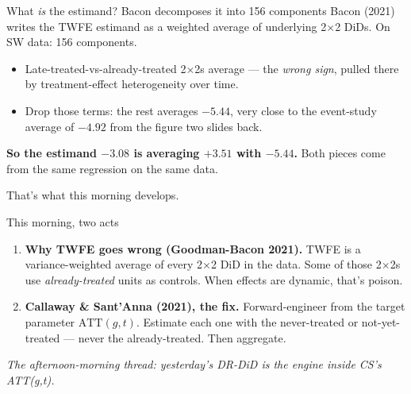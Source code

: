 \documentclass[aspectratio=169,11pt]{beamer}
\begin{document}
\begin{frame}{What \textit{is} the estimand?  Bacon decomposes it into 156 components}
\vspace{0.5em}
Bacon (2021) writes the TWFE estimand as a weighted average of underlying 2$\times$2 DiDs. \;On SW data: 156 components.

\vspace{0.7em}
\begin{itemize}
  \item Late-treated-vs-already-treated 2$\times$2s average  --- the \textit{wrong sign}, pulled there by treatment-effect heterogeneity over time.
  \vspace{0.3em}
  \item Drop those terms: the rest averages $-5.44$, very close to the event-study average of $-4.92$ from the figure two slides back.
\end{itemize}

\vspace{0.7em}
\textbf{So the estimand $-3.08$ is averaging $+3.51$ with $-5.44$.} \;Both pieces come from the same regression on the same data. \;

\vspace{0.4em}
That's what this morning develops.
\end{frame}

\begin{frame}{This morning, two acts}
\vspace{0.4em}
\begin{enumerate}
  \item \textbf{Why TWFE goes wrong (Goodman-Bacon 2021).} \;TWFE is a variance-weighted average of every 2$\times$2 DiD in the data. \;Some of those 2$\times$2s use \textit{already-treated} units as controls. \;When effects are dynamic, that's poison.
  \vspace{0.3em}
  \item \textbf{Callaway \& Sant'Anna (2021), the fix.} \;Forward-engineer from the target parameter $\text{ATT}(g,t)$. \;Estimate each one with the never-treated or not-yet-treated --- never the already-treated. \;Then aggregate.
\end{enumerate}

\vspace{0.6em}
\begin{center}
\small\color{warmgray}\itshape
The afternoon-morning thread: yesterday's DR-DiD is the engine inside CS's ATT(g,t).
\end{center}
\end{frame}
\end{document}

